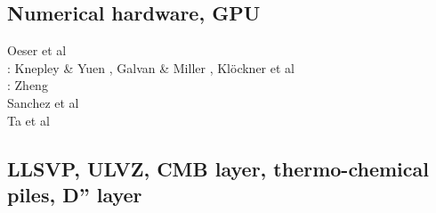 \subsection{Numerical hardware, GPU}
\label{sec:topics:hardware}

\begin{scriptsize}
Oeser et al \cite{oebm06}\\
\twothousandthirteen: Knepley \& Yuen \cite{knyu13}, Galvan \& Miller \cite{gami13}, 
                      Kl\"ockner et al \cite{klwh13}\\ 
\twothousandfourteen: Zheng \etal{} \cite{zhzg14}\\
Sanchez et al \cite{sagy13}\\
Ta et al \cite{tact15}\\
\end{scriptsize}

\subsection{LLSVP, ULVZ, CMB layer, thermo-chemical piles, D'' layer}

